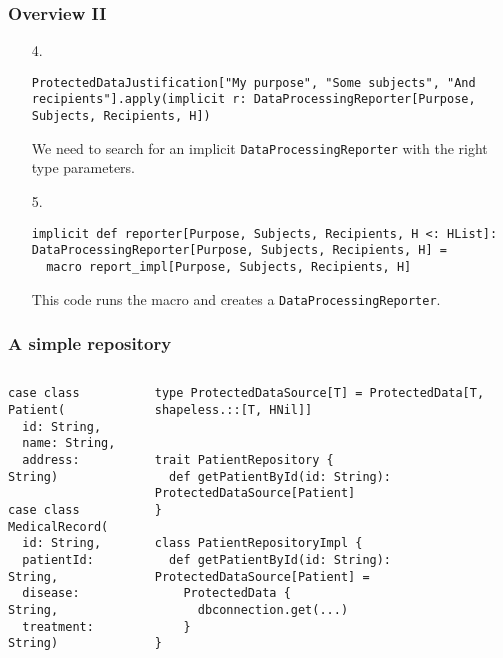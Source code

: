 \documentclass[aspectratio=169]{beamer}
\begin{document}
\begin{frame}[fragile]
\frametitle{Overview II}

\begin{enumerate}
\item[4.]
\begin{lstlisting}[style=myScalastyle,frame=none]
ProtectedDataJustification["My purpose", "Some subjects", "And recipients"].apply(implicit r: DataProcessingReporter[Purpose, Subjects, Recipients, H])
\end{lstlisting}
We need to search for an implicit \texttt{DataProcessingReporter} with the right type parameters.
\item[5.]

\begin{lstlisting}[style=myScalastyle,frame=none]
  implicit def reporter[Purpose, Subjects, Recipients, H <: HList]: DataProcessingReporter[Purpose, Subjects, Recipients, H] =
  macro report_impl[Purpose, Subjects, Recipients, H]
\end{lstlisting}
This code runs the macro and creates a \texttt{DataProcessingReporter}.
\end{enumerate}
\end{frame}

\begin{frame}[fragile]
\frametitle{A simple repository}

\begin{columns}
\begin{column}{0.3\textwidth}

\begin{lstlisting}[style=myScalastyle,frame=none]
case class Patient(
  id: String,
  name: String,
  address: String)
  
case class MedicalRecord(
  id: String,
  patientId: String,
  disease: String,
  treatment: String)
\end{lstlisting}


\end{column}
\vrule
\begin{column}{0.7\textwidth}  

\begin{lstlisting}[style=myScalastyle,frame=none]
type ProtectedDataSource[T] = ProtectedData[T, shapeless.::[T, HNil]]  


trait PatientRepository {
  def getPatientById(id: String): ProtectedDataSource[Patient]
}

class PatientRepositoryImpl {
  def getPatientById(id: String): ProtectedDataSource[Patient] =
    ProtectedData {
      dbconnection.get(...)
    }
}

\end{lstlisting}


\end{column}
\end{columns}

\end{frame}
\end{document}
